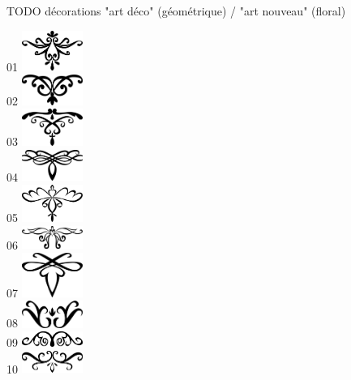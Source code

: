 \documentclass[a5paper]{letter}
\begin{document}
{{{{\clearpage

TODO décorations "art déco" (géométrique) / "art nouveau" (floral)

01 \includegraphics[width=0.15\textwidth]{../../images/artsdecos/ornement01whiteBG.png}~\\
02 \includegraphics[width=0.15\textwidth]{../../images/artsdecos/ornement02whiteBG.png}~\\
03 \includegraphics[width=0.15\textwidth]{../../images/artsdecos/ornement03whiteBG.png}~\\
04 \includegraphics[width=0.15\textwidth]{../../images/artsdecos/ornement04whiteBG.png}~\\
05 \includegraphics[width=0.15\textwidth]{../../images/artsdecos/ornement05whiteBG.png}~\\
06 \includegraphics[width=0.15\textwidth]{../../images/artsdecos/ornement06whiteBG.png}~\\
07 \includegraphics[width=0.15\textwidth]{../../images/artsdecos/ornement07whiteBG.png}~\\
08 \includegraphics[width=0.15\textwidth]{../../images/artsdecos/ornement08whiteBG.png}~\\
09 \includegraphics[width=0.15\textwidth]{../../images/artsdecos/ornement09whiteBG.png}~\\
10 \includegraphics[width=0.15\textwidth]{../../images/artsdecos/ornement10whiteBG.png}~\\

}}}}
\end{document}
